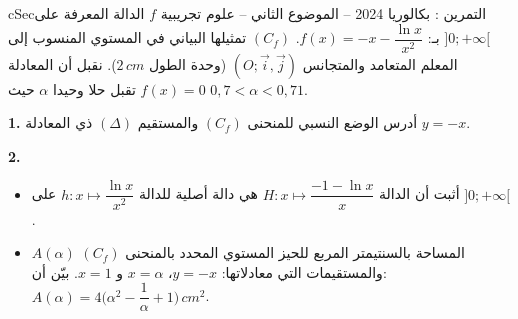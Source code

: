 \documentclass[12pt,a4paper]{article}
\newenvironment{BOX}[2]{\begin{otherlanguage}{english}\begin{arbox}{#1}{#2}}{\end{arbox}\end{otherlanguage}}
\newcounter{exo}
\newenvironment{tamrin}[1]{\stepcounter{exo}\begin{BOX}{cSec}{التمرين \theexo: #1}}{\end{BOX}}
\newenvironment{sq}{\begin{itemize}[leftmargin=2.4em,itemsep=3pt]}{\end{itemize}}
\newcommand{\qa}{\item[(أ)]}\newcommand{\qb}{\item[(ب)]}\newcommand{\qc}{\item[(جـ)]}\newcommand{\qd}{\item[(د)]}\newcommand{\qe}{\item[(هـ)]}
\newcommand{\QQ}[1]{\par\smallskip\textbf{#1.} }
\begin{document}
\begin{tamrin}{بكالوريا 2024 -- الموضوع الثاني -- علوم تجريبية}
$f$ الدالة المعرفة على $]0;+\infty[$ بـ: $f(x)=-x-\dfrac{\ln x}{x^2}$.
$(C_f)$ تمثيلها البياني في المستوي المنسوب إلى المعلم المتعامد والمتجانس $(O;\vec i,\vec j)$ (وحدة الطول $2\,cm$).
نقبل أن المعادلة $f(x)=0$ تقبل حلا وحيدا $\alpha$ حيث $0{,}7<\alpha<0{,}71$.
\QQ{1} أدرس الوضع النسبي للمنحنى $(C_f)$ والمستقيم $(\Delta)$ ذي المعادلة $y=-x$.
\QQ{2}
\begin{sq}
\qa أثبت أن الدالة $H:x\mapsto\dfrac{-1-\ln x}{x}$ هي دالة أصلية للدالة $h:x\mapsto\dfrac{\ln x}{x^2}$ على $]0;+\infty[$.
\qb $A(\alpha)$ المساحة بالسنتيمتر المربع للحيز المستوي المحدد بالمنحنى $(C_f)$ والمستقيمات التي معادلاتها: $y=-x$، $x=\alpha$ و $x=1$.
بيّن أن: $A(\alpha)=4\Big(\alpha^2-\dfrac1\alpha+1\Big)\,cm^2$.
\end{sq}
\end{tamrin}
\end{document}
